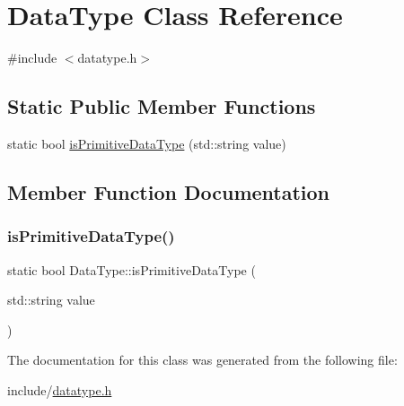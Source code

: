 \hypertarget{classDataType}{}\section{Data\+Type Class Reference}
\label{classDataType}


{\ttfamily \#include $<$datatype.\+h$>$}

\subsection*{Static Public Member Functions}
\begin{DoxyCompactItemize}
\item 
static bool \hyperlink{classDataType_a8dd169d383b0504b38649fe8ec60352e}{is\+Primitive\+Data\+Type} (std\+::string value)
\end{DoxyCompactItemize}


\subsection{Member Function Documentation}
\mbox{\label{classDataType_a8dd169d383b0504b38649fe8ec60352e}} 
\subsubsection{\texorpdfstring{is\+Primitive\+Data\+Type()}{isPrimitiveDataType()}}
{\footnotesize\ttfamily static bool Data\+Type\+::is\+Primitive\+Data\+Type (\begin{DoxyParamCaption}\item[{std\+::string}]{value }\end{DoxyParamCaption})\hspace{0.3cm}{\ttfamily [static]}}



The documentation for this class was generated from the following file\+:\begin{DoxyCompactItemize}
\item 
include/\hyperlink{datatype_8h}{datatype.\+h}\end{DoxyCompactItemize}
